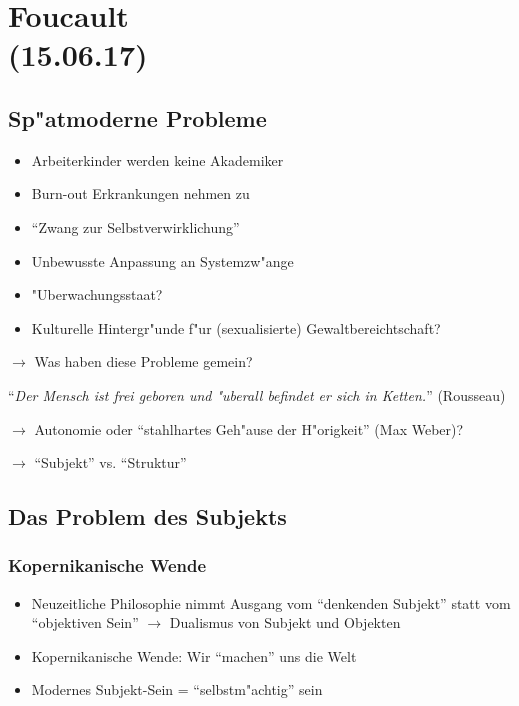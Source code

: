 \documentclass[emulatestandardclasses]{scrartcl}
\begin{document}
\section{Foucault
\\(15.06.17)}

\subsection{Sp"atmoderne Probleme}

\begin{itemize}
  \item Arbeiterkinder werden keine Akademiker
  \item Burn-out Erkrankungen nehmen zu
  \item "`Zwang zur Selbstverwirklichung"'
  \item Unbewusste Anpassung an Systemzw"ange
  \item "Uberwachungsstaat?
  \item Kulturelle Hintergr"unde f"ur (sexualisierte) Gewaltbereichtschaft?
\end{itemize}

$\rightarrow$ Was haben diese Probleme gemein?

"`\emph{Der Mensch ist frei geboren und "uberall befindet er sich in Ketten.}"' (Rousseau)

$\rightarrow$ Autonomie oder "`stahlhartes Geh"ause der H"origkeit"' (Max Weber)?

$\rightarrow$ "`Subjekt"' vs. "`Struktur"'

\subsection{Das Problem des Subjekts}

\subsubsection{Kopernikanische Wende}

\begin{itemize}
  \item Neuzeitliche Philosophie nimmt Ausgang vom "`denkenden Subjekt"' statt vom "`objektiven Sein"' $\rightarrow$ Dualismus von Subjekt und Objekten
  \item Kopernikanische Wende: Wir "`machen"' uns die Welt
  \item Modernes Subjekt-Sein = "`selbstm"achtig"' sein
\end{itemize}
\end{document}
